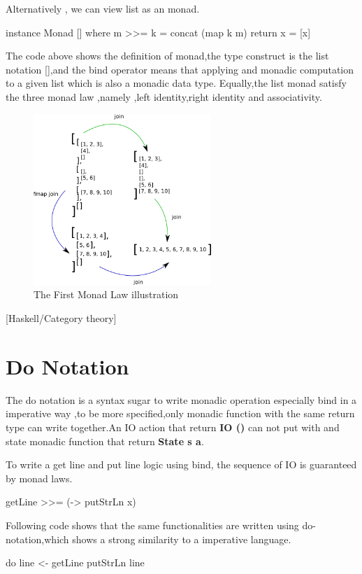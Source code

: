 Alternatively , we can view list as an monad.
\begin{hcode}
instance  Monad []  where
  m >>= k  = concat (map k m)
  return x = [x]
\end{hcode}

The code above shows the definition of monad,the type construct is the list notation [],and the bind operator means that applying and monadic computation to a given list which is also a monadic data type. Equally,the list monad satisfy the three monad law ,namely ,left identity,right identity and associativity.\\

\begin{figure}[H]
  \centering
	\includegraphics[width=0.60\textwidth]{pic/c3/list_monad.png}
	\caption{The First Monad Law illustration}
\end{figure} [Haskell/Category theory]



\section{Do Notation }
The do notation is a syntax sugar to write monadic operation especially bind in a imperative way ,to be more specified,only monadic function with the same return type can write together.An IO action that return \textbf{IO ()} can not put with and state monadic function that return \textbf{State s a}.

To write a get line and put line logic using bind, the sequence of IO is guaranteed by monad laws.
\begin{hcode}
 getLine >>= (\x -> putStrLn x)
\end{hcode}


Following code shows that the same functionalities are written using do-notation,which shows a strong similarity to a imperative language.
\begin{hcode}
do line <- getLine 
   putStrLn line
\end{hcode}

